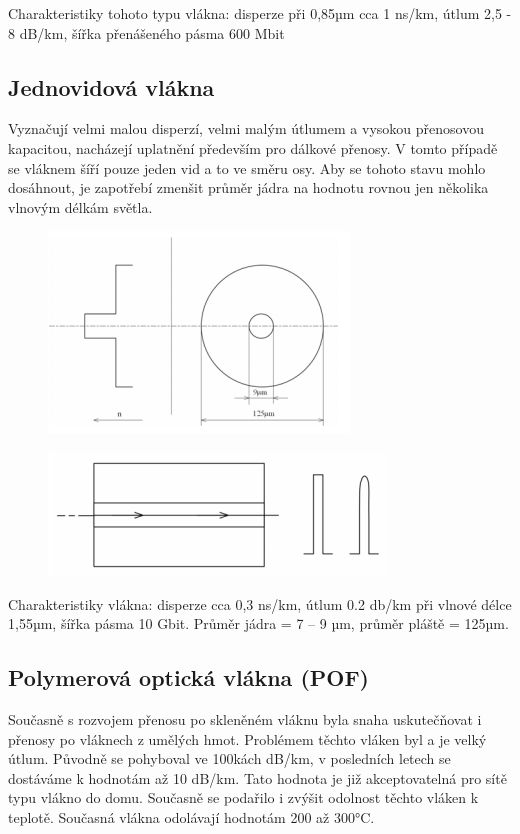 Charakteristiky tohoto typu vlákna: disperze při 0,85µm cca 1 ns/km, útlum 2,5 - 8 dB/km, šířka přenášeného pásma 600 Mbit


\subsection{Jednovidová vlákna}
Vyznačují velmi malou disperzí, velmi malým útlumem a vysokou přenosovou kapacitou, nacházejí uplatnění především pro dálkové přenosy. V tomto případě se vláknem šíří pouze jeden vid a to ve směru osy. Aby se tohoto stavu mohlo dosáhnout, je zapotřebí zmenšit průměr jádra na hodnotu rovnou jen několika vlnovým délkám světla. \newpage

\begin{figure}[!ht]
\begin{center}
    \includegraphics[scale=1]{obrazky/jednovid.png}
  \end{center}
\end{figure}

\begin{figure}[!ht]
\begin{center}
    \includegraphics[scale=1]{obrazky/sirjed.png}
  \end{center}
\end{figure}

Charakteristiky vlákna: disperze cca 0,3 ns/km, útlum 0.2 db/km při vlnové délce 1,55µm, šířka pásma 10 Gbit. Průměr jádra = 7 – 9 µm, průměr pláště = 125µm. 

\subsection{Polymerová optická vlákna (POF)}
Současně s rozvojem přenosu po skleněném vláknu byla snaha uskutečňovat i přenosy po vláknech z umělých hmot. Problémem těchto vláken byl a je velký útlum. Původně se pohyboval ve 100kách dB/km, v posledních letech se dostáváme k hodnotám až 10 dB/km. Tato hodnota je již akceptovatelná pro sítě typu vlákno do domu. Současně se podařilo i zvýšit odolnost těchto vláken k teplotě. Současná vlákna odolávají hodnotám 200 až 300°C. 

